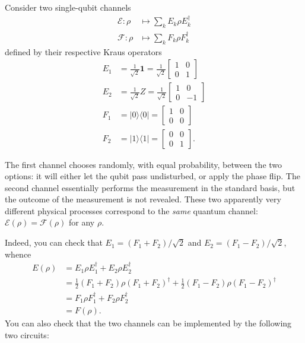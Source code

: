 \documentclass[fleqn]{article}
\begin{document}
\hypertarget{section-17}{%
\subsubsection{}\label{section-17}}

Consider two single-qubit channels
\[
  \begin{aligned}
    \mathcal{E}\colon \rho
    &\longmapsto \sum_k E_k\rho E_k^\dagger
  \\\mathcal{F}\colon \rho
    &\longmapsto \sum_k F_k\rho F_k^\dagger
  \end{aligned}
\]
defined by their respective Kraus operators
\[
  \begin{aligned}
    E_1
    &= \frac{1}{\sqrt{2}}\mathbf{1}
    = \frac{1}{\sqrt{2}}\begin{bmatrix}1&0\\0&1\end{bmatrix}
  \\E_2
    &= \frac{1}{\sqrt{2}}Z
    = \frac{1}{\sqrt{2}}\begin{bmatrix}1&0\\0&-1\end{bmatrix}
  \\F_1
    &= |0\rangle\langle 0|
    = \begin{bmatrix}1&0\\0&0\end{bmatrix}
  \\F_2
    &= |1\rangle\langle 1|
    = \begin{bmatrix}0&0\\0&1\end{bmatrix}.
  \end{aligned}
\]

The first channel chooses randomly, with equal probability, between the two options: it will either let the qubit pass undisturbed, or apply the phase flip.
The second channel essentially performs the measurement in the standard basis, but the outcome of the measurement is not revealed.
These two apparently very different physical processes correspond to the \emph{same} quantum channel: \(\mathcal{E}(\rho)=\mathcal{F}(\rho)\) for any \(\rho\).

Indeed, you can check that \(E_1=(F_1+F_2)/\sqrt{2}\) and \(E_2=(F_1-F_2)/\sqrt{2}\), whence
\[
  \begin{aligned}
    E(\rho)
    &= E_1\rho E_1^\dagger + E_2\rho E_2^\dagger
  \\&= \frac12(F_1+F_2)\rho(F_1+F_2)^\dagger + \frac12(F_1-F_2)\rho(F_1-F_2)^\dagger
  \\&= F_1\rho F_1^\dagger + F_2\rho F_2^\dagger
  \\&= F(\rho).
  \end{aligned}
\]
You can also check that the two channels can be implemented by the following two circuits:
\end{document}
